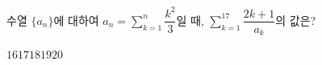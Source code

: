 \hspace*{2mm}\begin{minipage}[t]{\dimexpr\linewidth-2mm\relax}\vspace{0pt}
수열 $\{a_n\}$에 대하여 $a_n=\displaystyle\sum_{k=1}^{n}\dfrac{k^2}{3}$일 때, $\displaystyle\sum_{k=1}^{17}\dfrac{2k+1}{a_k}$의 값은?
\begin{choices32}{$16$}{$17$}{$18$}{$19$}{$20$}\end{choices32}\end{minipage}
